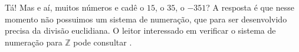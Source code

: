 \documentclass[../main.tex]{subfiles}
\begin{document}
Tá! Mas e aí, muitos números e cadê o $15$, o $35$, o $-351$? A resposta é que nesse momento não possuimos um sistema de numeração, que para ser desenvolvido precisa da divisão euclidiana. O leitor interessado em verificar o sistema de numeração para $\mathbb{Z}$ pode consultar \cite{hefez-algebra}.
\end{document}

